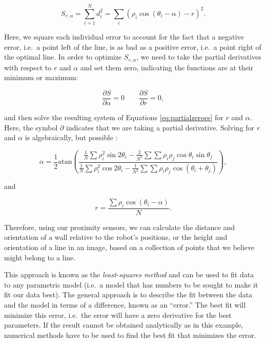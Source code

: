 \begin{equation}
S_{r,\alpha}=\sum_{i=1}^{N}{d_i^2}=\sum_i(\rho_i \cos(\theta_i-\alpha)-r)^2.
\end{equation}

Here, we square each individual error to account for the fact that a negative error, i.e.\ a point left of the line, is as bad as a positive error, i.e.\ a point right of the optimal line. In order to optimize $ S_{r,\alpha}$, we need to take the partial derivatives with respect to $ r$ and $ \alpha$ and set them zero, indicating the functions are at their minimum or maximum:

\begin{equation}
\frac{\partial{S}}{\partial{\alpha}}=0 \qquad \frac{\partial{S}}{\partial{r}}=0,
\label{eq:partialzeros}
\end{equation}

\noindent and then solve the resulting system of Equations \eqref{eq:partialzeroes} for $ r$ and $ \alpha$. Here, the symbol $ \partial$ indicates that we are taking a partial derivative. Solving for $r$ and $\alpha$ is algebraically, but possible \cite{siegwart2011introduction}:

\begin{equation}\label{eq:linealpha}
\alpha=\frac{1}{2}\text{atan}\left(\frac{\frac{1}{N}\sum{\rho_i^2 \sin 2\theta_i}-\frac{2}{N^2}\sum{\sum{\rho_i\rho_j \cos \theta_i \sin \theta_j}}}{\frac{1}{N}\sum{\rho_i^2 \cos 2 \theta_i - \frac{1}{N^2}\sum{\sum{\rho_i \rho_j \cos(\theta_i+\theta_j)}}}}\right),
\end{equation}

\noindent and

\begin{equation}\label{eq:liner}
r=\frac{{\sum \rho_i \cos (\theta_i-\alpha)}}{N}.
\end{equation}

Therefore, using our proximity sensors, we can calculate the distance and orientation of a wall relative to the robot's positions, or the height and orientation of a line in an image, based on a collection of points that we believe might belong to a line.

This approach is known as the \textsl{least-squares method} and can be used to fit data to any parametric model (i.e.\ a model that has numbers to be sought to make it fit our data best). The general approach is to describe the fit between the data and the model in terms of a difference, known as an ``error.'' The best fit will minimize this error, i.e.\ the error will have a zero derivative for the best parameters. If the result cannot be obtained analytically as in this example, numerical methods have to be used to find the best fit that minimizes the error.

